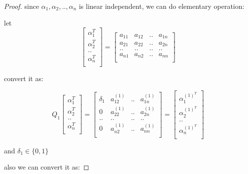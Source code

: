 \begin{proof}
    since $\alpha_1, \alpha_2, .. , \alpha_n$ is linear independent, we can do elementary operation:

    let 
    \[
    \begin{bmatrix}
            \alpha_1^T \\
            \alpha_2^T \\
            .. \\
            \alpha_n^T \\
    \end{bmatrix} = \begin{bmatrix}
        a_{11} & a_{12} & .. & a_{1n} \\
        a_{21} & a_{22} & .. & a_{2n} \\
        .. & .. & .. & .. \\
        a_{n1} & a_{n2} & .. & a_{nn} \\
    \end{bmatrix}
    \]

    convert it as:


    \[
    Q_1\begin{bmatrix}
            \alpha_1^T \\
            \alpha_2^T \\
            .. \\
            \alpha_n^T \\
    \end{bmatrix} = \begin{bmatrix}
        \delta_1 & a_{12}^{(1)} & .. & a_{1n}^{(1)} \\
        0 & a_{22}^{(1)} & .. & a_{2n}^{(1)} \\
        .. & .. & .. & .. \\
        0 & a_{n2}^{(1)} & .. & a_{nn}^{(1)} \\
    \end{bmatrix} = \begin{bmatrix}
            \alpha_1^{(1)^T} \\
            \alpha_2^{(1)^T} \\
            .. \\
            \alpha_n^{(1)^T} \\
    \end{bmatrix}
    \]

    and $\delta_1 \in \{0, 1\}$ 

    also we can convert it as:



\end{proof}

